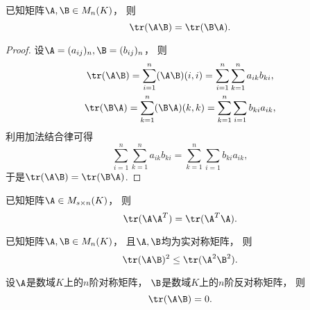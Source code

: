\begin{property}\label{theorem:矩阵的迹.矩阵乘积交换次序不变迹}
已知矩阵\(\A,\B \in M_n(K)\)，
则\begin{equation}
	\tr(\A\B) = \tr(\B\A).
\end{equation}
\begin{proof}
设\(\A = (a_{ij})_n,
\B = (b_{ij})_n\)，
则\begin{gather*}
	\tr(\A\B)
	= \sum_{i=1}^n (\A\B)(i,i)
	= \sum_{i=1}^n \sum_{k=1}^n a_{ik} b_{ki}, \\
	\tr(\B\A)
	= \sum_{k=1}^n (\B\A)(k,k)
	= \sum_{k=1}^n \sum_{i=1} b_{ki} a_{ik},
\end{gather*}
利用加法结合律可得\[
	\sum_{i=1}^n \sum_{k=1}^n a_{ik} b_{ki}
	= \sum_{k=1}^n \sum_{i=1} b_{ki} a_{ik},
\]
于是\(\tr(\A\B) = \tr(\B\A)\).
\end{proof}
\end{property}

\begin{property}
已知矩阵\(\A \in M_{s \times n}(K)\)，
则\begin{equation}
	\tr(\A\A^T) = \tr(\A^T\A).
\end{equation}
\end{property}

\begin{property}
已知矩阵\(\A,\B \in M_n(K)\)，
且\(\A,\B\)均为实对称矩阵，
则\begin{equation}
	\tr(\A\B)^2 \leq \tr(\A^2\B^2).
\end{equation}
\end{property}

\begin{property}
设\(\A\)是数域\(K\)上的\(n\)阶对称矩阵，
\(\B\)是数域\(K\)上的\(n\)阶反对称矩阵，
则\begin{equation}
	\tr(\A\B) = 0.
\end{equation}
\end{property}
